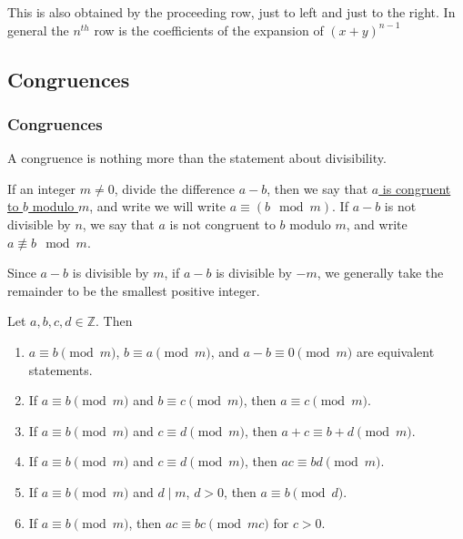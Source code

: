 \documentclass[11pt]{article}
\begin{document}
This is also obtained by the proceeding row, just to left and just to the
right. In general the \(n^{th}\) row is the coefficients of the expansion of
\((x + y)^{n - 1}\)

\subsection{Congruences}
\subsubsection{Congruences}
A congruence is nothing more than the statement about divisibility.
\begin{definition}
	If an integer \(m \neq 0\), divide the difference \(a - b\), then we say that \underline{\(a\) is congruent to \(b\) modulo \(m\)}, and write we will write \(a \equiv (b \mod{m})\). If \(a - b\) is not divisible by \(n\), we say that \(a\) is not congruent to \(b\) modulo \(m\), and write \(a \not\equiv b \mod{m}\).
\end{definition}

\begin{fact}
	Since \(a - b\) is divisible by \(m\), if \(a - b\) is divisible by \(-m\), we generally take the remainder to be the smallest positive integer.
\end{fact}

\begin{theorem}\label{2.1}
	Let \(a, b, c, d \in \mathbb{Z}\). Then
	\begin{enumerate}
		\item \(a \equiv b \pmod{m}\), \(b \equiv a \pmod{m}\), and \(a - b \equiv 0 \pmod{m}\) are equivalent statements.
		\item If \(a \equiv b \pmod{m}\) and \(b \equiv c \pmod{m}\), then \(a \equiv c
		      \pmod{m}\).
		\item If \(a \equiv b \pmod{m}\) and \(c \equiv d \pmod{m}\), then \(a + c \equiv b +
		      d \pmod{m}\).
		\item If \(a \equiv b \pmod{m}\) and \(c \equiv d \pmod{m}\), then \(ac \equiv bd
		      \pmod{m}\).
		\item If \(a \equiv b \pmod{m}\) and \(d \mid m\), \(d > 0\), then \(a \equiv b
		      \pmod{d}\).
		\item If \(a \equiv b \pmod{m}\), then \(ac \equiv bc \pmod{mc}\) for \(c > 0\).
	\end{enumerate}
\end{theorem}
\end{document}
